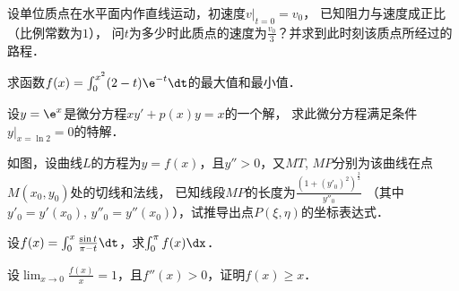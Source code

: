 \documentclass[plain,noanswer,medmath]{../../template/jnuexam}
\begin{document}
\begin{problem}
设单位质点在水平面内作直线运动，初速度$v\big|_{t = 0} = v_0$，
已知阻力与速度成正比（比例常数为$1$），
问$t$为多少时此质点的速度为$\frac{v_0}{3}$？并求到此时刻该质点所经过的路程．
\end{problem}



\begin{problem}
求函数$f(x) = \int_0^{x^2} (2 - t) \e^{- t} \dt$的最大值和最小值．
\end{problem}



\begin{problem}
设$y = \e^x$是微分方程$xy' + p(x)y = x$的一个解，
求此微分方程满足条件$y\big|_{x=\ln2}=0$的特解．
\end{problem}



\begin{problem}
如图，设曲线$L$的方程为$y = f(x)$，且$y'' > 0$，又$MT$, $MP$分别为该曲线在点$M(x_0,y_0)$处的切线和法线，
已知线段$MP$的长度为$\frac{\left(1 + (y'_0)^2 \right)^{\frac{3}{2}}}{y''_0}$%
（其中$y'_0 = y'(x_0)$, $y''_0 = y''(x_0)$），试推导出点$P(\xi ,\eta)$的坐标表达式．
 
\end{problem}



\begin{problem}
设$f(x) = \int_0^x \frac{\sin t}{\pi - t} \dt$，求$\int_0^{\pi}f(x)\dx$．
\end{problem}



\begin{problem}
设$\lim_{x \to 0} \frac{f(x)}{x} = 1$，且$f''(x) > 0$，证明$f(x) \ge x$．
\end{problem}
\end{document}
